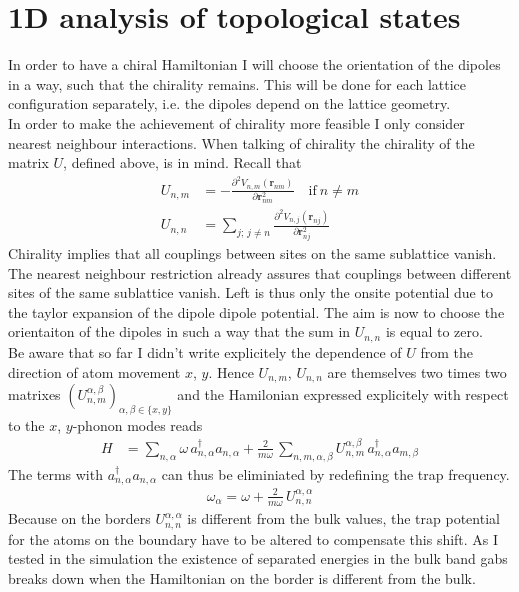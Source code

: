 \section*{1D analysis of topological states}
In order to have a chiral Hamiltonian I will choose the orientation of the dipoles in a way, such that the chirality remains. This will be done for each lattice configuration separately, i.e. the dipoles depend on the lattice geometry.\\
In order to make the achievement of chirality more feasible I only consider nearest neighbour interactions. When talking of chirality the chirality of the matrix $U$, defined above, is in mind. Recall that
\begin{align*}
    U_{n,m}&=
        -\frac{\partial^2 V_{n,m}(\mathbf{r}_{nm})}{\partial\mathbf{r}_{nm}^2}\quad\text{if}\:n\neq m\\
    U_{n,n} &= \sum_{j;\,j\neq n}\frac{\partial^2 V_{n,j}(\mathbf{r}_{nj})}{\partial\mathbf{r}_{nj}^2}
\end{align*}
Chirality implies that all couplings between sites on the same sublattice vanish. The nearest neighbour restriction already assures that couplings between different sites of the same sublattice vanish. Left is thus only the onsite potential due to the taylor expansion of the dipole dipole potential. The aim is now to choose the orientaiton of the dipoles in such a way that the sum in $U_{n,n}$ is equal to zero.\\ Be aware that so far I didn't write explicitely the dependence of $U$ from the direction of atom movement $x$, $y$. Hence $U_{n,m}$, $U_{n,n}$ are themselves two times two matrixes $(U_{n,m}^{\alpha,\beta})_{\alpha,\beta\in\{x,y\}}$ and the Hamilonian expressed explicitely with respect to the $x$, $y$-phonon modes reads
\begin{align*}
    H &= \sum_{n,\alpha} \omega\,a_{n,\alpha}^\dagger a_{n,\alpha} +\frac{2}{m\omega}\, \sum_{n,m,\alpha,\beta} U^{\alpha,\beta}_{n,m}\,a_{n,\alpha}^\dagger a_{m,\beta}    
\end{align*}
The terms with $a_{n,\alpha}^\dagger a_{n,\alpha}$ can thus be eliminiated by redefining the trap frequency.
\begin{align*}
    \omega_\alpha=\omega+\frac{2}{m\omega}\,U^{\alpha,\alpha}_{n,n}
\end{align*}
Because on the borders $U_{n,n}^{\alpha,\alpha}$ is different from the bulk values, the trap potential for the atoms on the boundary have to be altered to compensate this shift. As I tested in the simulation the existence of separated energies in the bulk band gabs breaks down when the Hamiltonian on the border is different from the bulk.

